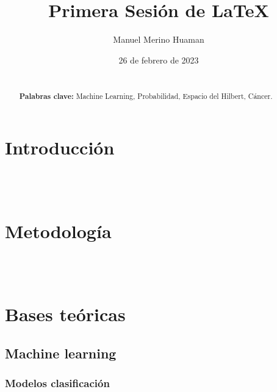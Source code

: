 \documentclass[a4paper, 11pt]{article}
\author{Manuel Merino Huaman}
\title{Primera Sesión de \LaTeX}
\date{26 de febrero de 2023}
\begin{document}
    \maketitle
    
    \begin{abstract}
        \lipsum[9]\\
        
        \noindent
        \textbf{Palabras clave:} Machine Learning, Probabilidad, Espacio del Hilbert, Cáncer.
    \end{abstract}
    
    
    
    
    \begin{multicols}{2}
        
        \section{Introducción}\label{sec: intro}
            \lipsum[3] \\
            
            \lipsum[9]\\
            
            \lipsum[1]
        
        \section{Metodología}\label{sec: met}
            \lipsum[2]\\
            
            \lipsum[1] \lipsum[9]\\
            
            \lipsum[5]
            
            
        
        \section{Bases teóricas}\label{sec: base teo}
            \lipsum[9]
            \subsection{Machine learning}\label{subsec: ML}
                \lipsum[11]
                
                \subsubsection{Modelos clasificación}\label{subsubsec: Clasi}
                    \lipsum[1] \lipsum[4]\\
                    

\end{multicols}
\end{document}
